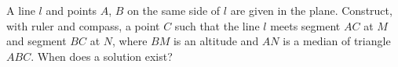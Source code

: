 A line $l$ and points $A$, $B$ on the same side of $l$ are given in the plane. Construct, with ruler and compass, a point $C$ such that the line $l$ meets segment $AC$ at $M$ and segment $BC$ at $N$, where $BM$ is an altitude and $AN$ is a median of triangle $ABC$. When does a solution exist?

